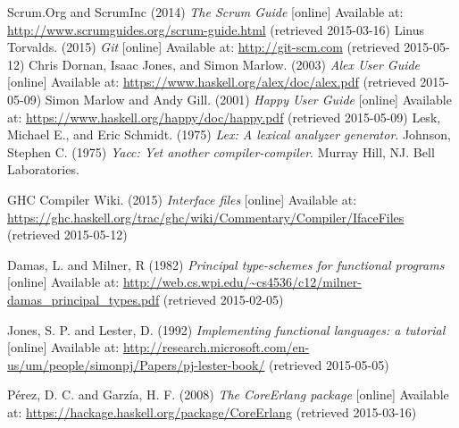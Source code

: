 \begin{thebibliography}{69}
 Scrum.Org and ScrumInc (2014) \textit{The Scrum Guide} [online] Available at: \url{http://www.scrumguides.org/scrum-guide.html} (retrieved 2015-03-16)
  Linus Torvalds. (2015) \textit{Git} [online] Available at: \url{http://git-scm.com} (retrieved 2015-05-12)
 Chris Dornan, Isaac Jones, and Simon Marlow. (2003) \textit{Alex User Guide} [online] Available at: \url{https://www.haskell.org/alex/doc/alex.pdf} (retrieved 2015-05-09)
 Simon Marlow and Andy Gill. (2001) \textit{Happy User Guide} [online] Available at: \url{https://www.haskell.org/happy/doc/happy.pdf} (retrieved 2015-05-09)
 Lesk, Michael E., and Eric Schmidt. (1975) \textit{Lex: A lexical analyzer generator}.
 Johnson, Stephen C. (1975) \textit{Yacc: Yet another compiler-compiler}. Murray Hill, NJ. Bell Laboratories.


  GHC Compiler Wiki. (2015) \textit{Interface files} [online] Available at: \url{https://ghc.haskell.org/trac/ghc/wiki/Commentary/Compiler/IfaceFiles} (retrieved 2015-05-12)

 Damas, L. and Milner, R (1982) \textit{Principal type-schemes for functional programs} [online] Available at: \url{http://web.cs.wpi.edu/~cs4536/c12/milner-damas_principal_types.pdf} (retrieved 2015-02-05)

 Jones, S. P. and Lester, D. (1992) \textit{Implementing functional languages: a tutorial} [online] Available at: \url{http://research.microsoft.com/en-us/um/people/simonpj/Papers/pj-lester-book/} (retrieved 2015-05-05)


 Pérez, D. C. and Garzía, H. F. (2008) \textit{The CoreErlang package} [online] Available at: \url{https://hackage.haskell.org/package/CoreErlang} (retrieved 2015-03-16)

\end{thebibliography}
